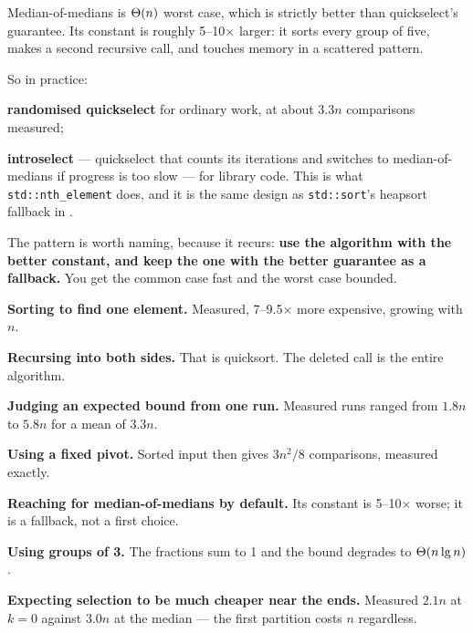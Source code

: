 \begin{alertbox}
Median-of-medians is $\Theta(n)$ worst case, which is strictly better than
quickselect's guarantee. Its constant is roughly 5--10$\times$ larger: it sorts
every group of five, makes a second recursive call, and touches memory in a
scattered pattern.

\smallskip
So in practice:
\begin{tight}
  \item \textbf{randomised quickselect} for ordinary work, at about $3.3n$
        comparisons measured;
  \item \textbf{introselect} --- quickselect that counts its iterations and
        switches to median-of-medians if progress is too slow --- for library
        code. This is what \texttt{std::nth\_element} does, and it is the same
        design as \texttt{std::sort}'s heapsort fallback in .
\end{tight}

\smallskip
The pattern is worth naming, because it recurs: \textbf{use the algorithm with
the better constant, and keep the one with the better guarantee as a
fallback.} You get the common case fast and the worst case bounded.
\end{alertbox}

\begin{pitfall}
\begin{tight}
  \item \textbf{Sorting to find one element.} Measured, 7--9.5$\times$ more
        expensive, growing with $n$.
  \item \textbf{Recursing into both sides.} That is quicksort. The deleted call
        is the entire algorithm.
  \item \textbf{Judging an expected bound from one run.} Measured runs ranged
        from $1.8n$ to $5.8n$ for a mean of $3.3n$.
  \item \textbf{Using a fixed pivot.} Sorted input then gives $3n^{2}/8$
        comparisons, measured exactly.
  \item \textbf{Reaching for median-of-medians by default.} Its constant is
        5--10$\times$ worse; it is a fallback, not a first choice.
  \item \textbf{Using groups of 3.} The fractions sum to 1 and the bound
        degrades to $\Theta(n\operatorname{lg} n)$.
  \item \textbf{Expecting selection to be much cheaper near the ends.}
        Measured $2.1n$ at $k=0$ against $3.0n$ at the median --- the first
        partition costs $n$ regardless.
\end{tight}
\end{pitfall}

